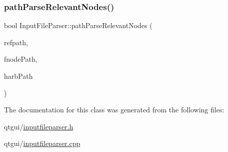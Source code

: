 \mbox{\label{class_input_file_parser_a140a7650651f70f31a3a58538facd8f5}} 
\subsubsection{\texorpdfstring{pathParseRelevantNodes()}{pathParseRelevantNodes()}}
{\footnotesize\ttfamily bool Input\+File\+Parser\+::path\+Parse\+Relevant\+Nodes (\begin{DoxyParamCaption}\item[{const Q\+String \&}]{refpath,  }\item[{Q\+String \&}]{fnode\+Path,  }\item[{Q\+String \&}]{harb\+Path }\end{DoxyParamCaption})}



The documentation for this class was generated from the following files\+:\begin{DoxyCompactItemize}
\item 
qtgui/\mbox{\hyperlink{inputfileparser_8h}{inputfileparser.\+h}}\item 
qtgui/\mbox{\hyperlink{inputfileparser_8cpp}{inputfileparser.\+cpp}}\end{DoxyCompactItemize}

